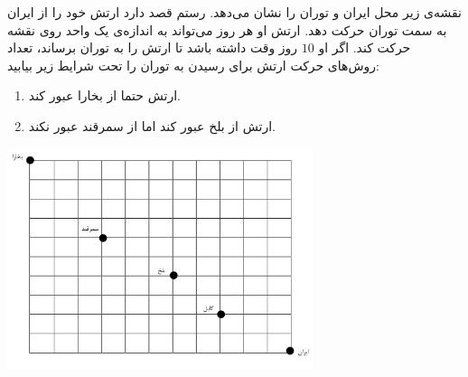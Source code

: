 \EXERCISE
نقشه‌ی زیر محل ایران و توران را نشان می‌دهد. رستم قصد دارد ارتش خود را از ایران به سمت توران حرکت دهد. ارتش او هر روز می‌تواند به اندازه‌ی یک واحد روی نقشه حرکت کند. اگر او
$10$
روز وقت داشته باشد تا ارتش را به توران برساند، تعداد روش‌های حرکت ارتش برای رسیدن به توران را تحت شرایط زیر بیابید:
\begin{enumerate}
\item
ارتش حتما از بخارا عبور کند.
\item
ارتش از بلخ عبور کند اما از سمرقند عبور نکند.
\end{enumerate}
\begin{center}
\includegraphics[height=6.5cm]{13.png}
\end{center}